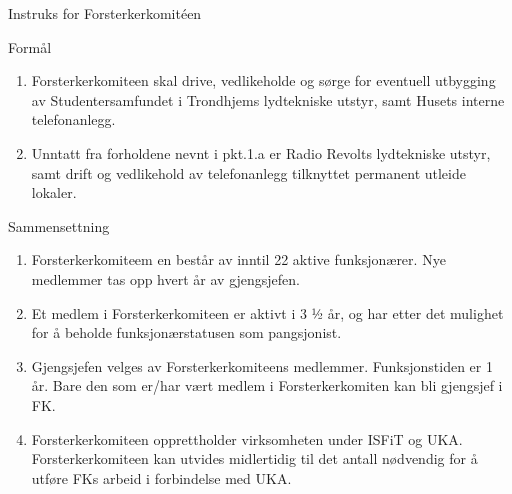 \documentclass[../fsbok.tex]{subfiles}
\begin{document}
\begin{instruks*}{Instruks for Forsterkerkomit\'een}

    \begin{instruksledd}{Formål}
        \begin{enumerate}
            \item Forsterkerkomiteen skal drive, vedlikeholde og sørge for eventuell utbygging av
            Studentersamfundet i
            Trondhjems lydtekniske utstyr, samt Husets interne telefonanlegg.
            \item Unntatt fra forholdene nevnt i pkt.1.a er Radio Revolts lydtekniske utstyr, samt drift
            og vedlikehold av telefonanlegg tilknyttet permanent utleide lokaler.
        \end{enumerate}
    \end{instruksledd}

    \begin{instruksledd}{Sammensettning}
        \begin{enumerate}
            \item Forsterkerkomiteem en består av inntil 22 aktive funksjonærer. Nye medlemmer tas opp
                hvert år av gjengsjefen.
            \item Et medlem i Forsterkerkomiteen er aktivt i 3 ½ år, og har etter det mulighet for å
                beholde funksjonærstatusen som pangsjonist.
            \item Gjengsjefen velges av Forsterkerkomiteens medlemmer. Funksjonstiden er 1 år. Bare den
                som er/har vært medlem i Forsterkerkomiten kan bli gjengsjef i FK.
            \item Forsterkerkomiteen opprettholder virksomheten under ISFiT og UKA.
                Forsterkerkomiteen kan utvides midlertidig til det antall nødvendig for å utføre FKs arbeid i forbindelse med UKA.
        \end{enumerate}
    \end{instruksledd}


\end{instruks*}
\end{document}
